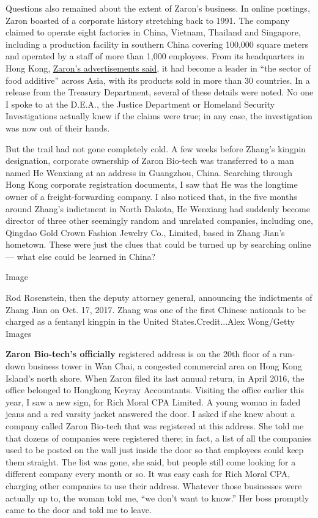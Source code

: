 Questions also remained about the extent of Zaron's business. In online
postings, Zaron boasted of a corporate history stretching back to 1991.
The company claimed to operate eight factories in China, Vietnam,
Thailand and Singapore, including a production facility in southern
China covering 100,000 square meters and operated by a staff of more
than 1,000 employees. From its headquarters in Hong Kong,
\href{http://www.tradeholding.net/default.cgi/action/viewcompanies/companyid/667101/}{Zaron's
advertisements said}, it had become a leader in ``the sector of food
additive'' across Asia, with its products sold in more than 30
countries. In a release from the Treasury Department, several of these
details were noted. No one I spoke to at the D.E.A., the Justice
Department or Homeland Security Investigations actually knew if the
claims were true; in any case, the investigation was now out of their
hands.

But the trail had not gone completely cold. A few weeks before Zhang's
kingpin designation, corporate ownership of Zaron Bio-tech was
transferred to a man named He Wenxiang at an address in Guangzhou,
China. Searching through Hong Kong corporate registration documents, I
saw that He was the longtime owner of a freight-forwarding company. I
also noticed that, in the five months around Zhang's indictment in North
Dakota, He Wenxiang had suddenly become director of three other
seemingly random and unrelated companies, including one, Qingdao Gold
Crown Fashion Jewelry Co., Limited, based in Zhang Jian's hometown.
These were just the clues that could be turned up by searching online
--- what else could be learned in China?

Image

Rod Rosenstein, then the deputy attorney general, announcing the
indictments of Zhang Jian on Oct. 17, 2017. Zhang was one of the first
Chinese nationals to be charged as a fentanyl kingpin in the United
States.Credit...Alex Wong/Getty Images

\textbf{Zaron Bio-tech's officially} registered address is on the 20th
floor of a run-down business tower in Wan Chai, a congested commercial
area on Hong Kong Island's north shore. When Zaron filed its last annual
return, in April 2016, the office belonged to Hongkong Keyray
Accountants. Visiting the office earlier this year, I saw a new sign,
for Rich Moral CPA Limited. A young woman in faded jeans and a red
varsity jacket answered the door. I asked if she knew about a company
called Zaron Bio-tech that was registered at this address. She told me
that dozens of companies were registered there; in fact, a list of all
the companies used to be posted on the wall just inside the door so that
employees could keep them straight. The list was gone, she said, but
people still come looking for a different company every month or so. It
was easy cash for Rich Moral CPA, charging other companies to use their
address. Whatever those businesses were actually up to, the woman told
me, ``we don't want to know.'' Her boss promptly came to the door and
told me to leave.

